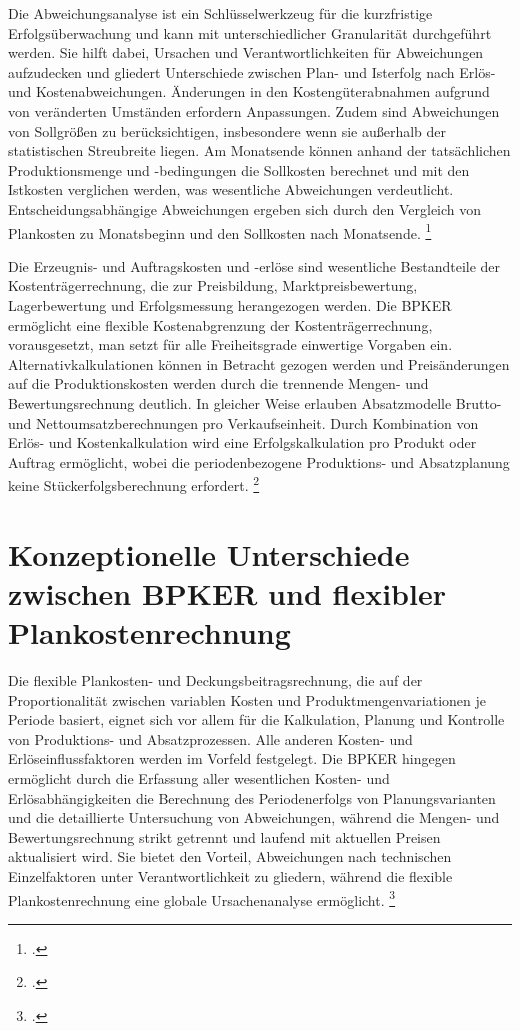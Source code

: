 Die Abweichungsanalyse ist ein Schlüsselwerkzeug für die kurzfristige Erfolgsüberwachung und kann mit unterschiedlicher Granularität durchgeführt werden. Sie hilft dabei, Ursachen und Verantwortlichkeiten für Abweichungen aufzudecken und gliedert Unterschiede zwischen Plan- und Isterfolg nach Erlös- und Kostenabweichungen. Änderungen in den Kostengüterabnahmen aufgrund von veränderten Umständen erfordern Anpassungen. Zudem sind Abweichungen von Sollgrö{\ss}en zu berücksichtigen, insbesondere wenn sie au{\ss}erhalb der statistischen Streubreite liegen. Am Monatsende können anhand der tatsächlichen Produktionsmenge und -bedingungen die Sollkosten berechnet und mit den Istkosten verglichen werden, was wesentliche Abweichungen verdeutlicht. Entscheidungsabhängige Abweichungen ergeben sich durch den Vergleich von Plankosten zu Monatsbeginn und den Sollkosten nach Monatsende. \footcite[Vgl.][S. 305ff]{Artikel_orginal}

Die Erzeugnis- und Auftragskosten und -erlöse sind wesentliche Bestandteile der Kostenträgerrechnung, die zur Preisbildung, Marktpreisbewertung, Lagerbewertung und Erfolgsmessung herangezogen werden. Die BPKER ermöglicht eine flexible Kostenabgrenzung der Kostenträgerrechnung, vorausgesetzt, man setzt für alle Freiheitsgrade einwertige Vorgaben ein. Alternativkalkulationen können in Betracht gezogen werden und Preisänderungen auf die Produktionskosten werden durch die trennende Mengen- und Bewertungsrechnung deutlich. In gleicher Weise erlauben Absatzmodelle Brutto- und Nettoumsatzberechnungen pro Verkaufseinheit. Durch Kombination von Erlös- und Kostenkalkulation wird eine Erfolgskalkulation pro Produkt oder Auftrag ermöglicht, wobei die periodenbezogene Produktions- und Absatzplanung keine Stückerfolgsberechnung erfordert. \footcite[Vgl.][S. 307f]{Artikel_orginal}

\section{Konzeptionelle Unterschiede zwischen BPKER und flexibler Plankostenrechnung}

Die flexible Plankosten- und Deckungsbeitragsrechnung, die auf der Proportionalität zwischen variablen Kosten und Produktmengenvariationen je Periode basiert, eignet sich vor allem für die Kalkulation, Planung und Kontrolle von Produktions- und Absatzprozessen. Alle anderen Kosten- und Erlöseinflussfaktoren werden im Vorfeld festgelegt. Die BPKER hingegen ermöglicht durch die Erfassung aller wesentlichen Kosten- und Erlösabhängigkeiten die Berechnung des Periodenerfolgs von Planungsvarianten und die detaillierte Untersuchung von Abweichungen, während die Mengen- und Bewertungsrechnung strikt getrennt und laufend mit aktuellen Preisen aktualisiert wird. Sie bietet den Vorteil, Abweichungen nach technischen Einzelfaktoren unter Verantwortlichkeit zu gliedern, während die flexible Plankostenrechnung eine globale Ursachenanalyse ermöglicht. \footcite[Vgl.][S. 308ff]{Artikel_orginal}

